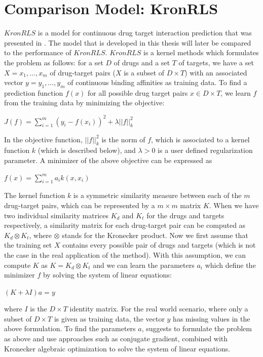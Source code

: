 \section{Comparison Model: KronRLS}
$KronRLS$ is a model for continuous drug target interaction prediction that was presented in \cite{pahikkala2014toward}. The model that is developed in this thesis will later be compared to the performance of $KronRLS$. $KronRLS$ is a kernel methods which formulates the problem as follows:
for a set $D$ of drugs and a set $T$ of targets, we have a set $X = x_1,\dots,x_m$ of drug-target pairs ($X$ is a subset of $D\times T$) with an associated vector $y = y_1,\dots,y_m$ of continuous binding affinities as training data. To find a prediction function $f(x)$ for all possible drug target pairs $x \in D\times T$, we learn $f$ from the training data by minimizing the objective:
\begin{center}
$J(f) = \sum\limits_{i=1}^{m}(y_i-f(x_i))^2 + \lambda ||f||_k^2$
\end{center}
In the objective function, $||f||_k^2$ is the norm of $f$, which is associated to a kernel function $k$ (which is described below), and $\lambda>0$ is a user defined regularization parameter. A minimizer of the above objective can be expressed as \begin{center}
$f(x)=\sum\limits_{i=1}^
{m} a_i k(x,x_i)$
\end{center}
The kernel function $k$ is a symmetric similarity measure between each of the $m$ drug-target pairs, which can be represented by a $m \times m$ matrix $K$. When we have two individual similarity matrices $K_d$ and $K_t$ for the drugs and targets respectively, a similarity matrix for each drug-target pair can be computed as \mbox{$K_d \otimes K_t$}, where $\otimes$ stands for the Kronecker product. Now we first assume that the training set $X$ contains every possible pair of drugs and targets (which is not the case in the real application of the method). With this assumption, we can compute $K$ as \mbox{$K = K_d \otimes K_t$} and we can learn the parameters $a_i$ which define the minimizer $f$ by solving the system of linear equations:
\begin{center}
$(K+\lambda I)a = y$
\end{center}where $I$ is the $D\times T$ identity matrix.
For the real world scenario, where only a subset of $D\times T$ is given as training data, the vector $y$ has missing values in the above formulation. To find the parameters $a$,  \cite{pahikkala2014toward} suggests to formulate the problem as above and use approaches such as conjugate gradient, combined with Kronecker algebraic optimization to solve the system of linear equations.


